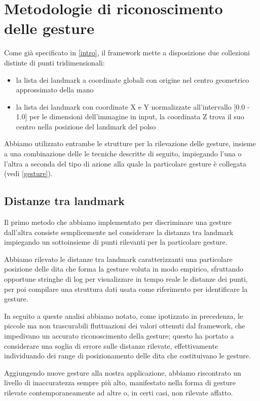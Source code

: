\chapter{Metodologie di riconoscimento delle gesture}
\label{chap:metodi}

Come già specificato in \ref{intro}, il framework mette a disposizione due collezioni distinte di punti tridimensionali: 
\begin{itemize}
    \item la lista dei landmark a coordinate globali con origine nel centro geometrico approssimato della mano
    \item la lista dei landmark con coordinate X e Y normalizzate all'intervallo [0.0 - 1.0] per le dimensioni dell'immagine in input, la coordinata Z trova il suo centro nella posizione del landmark del polso
\end{itemize}

\noindent Abbiamo utilizzato entrambe le strutture per la rilevazione delle gesture, insieme a una combinazione delle le tecniche descritte di seguito, impiegando l'una o l'altra a seconda del tipo di azione alla quale la particolare gesture è collegata (vedi \ref{gesture}).

\section{Distanze tra landmark}

Il primo metodo che abbiamo implementato per discriminare una gesture dall'altra consiste semplicemente nel considerare la distanza tra landmark impiegando un sottoinsieme di punti rilevanti per la particolare gesture.

Abbiamo rilevato le distanze tra landmark caratterizzanti una particolare posizione delle dita che forma la gesture voluta in modo empirico, sfruttando opportune stringhe di log per visualizzare in tempo reale le distanze dei punti, per poi compilare una struttura dati usata come riferimento per identificare la gesture.

In seguito a queste analisi abbiamo notato, come ipotizzato in precedenza, le piccole ma non trascurabili fluttuazioni dei valori ottenuti dal framework, che impedivano un accurato riconoscimento della gesture; questo ha portato a considerare una soglia di errore sulle distanze rilevate, effettivamente individuando dei range di posizionamento delle dita che costituivano le gesture.

Aggiungendo nuove gesture alla nostra applicazione, abbiamo riscontrato un livello di inaccuratezza sempre più alto, manifestato nella forma di gesture rilevate contemporaneamente ad altre o, in certi casi, non rilevate affatto.

